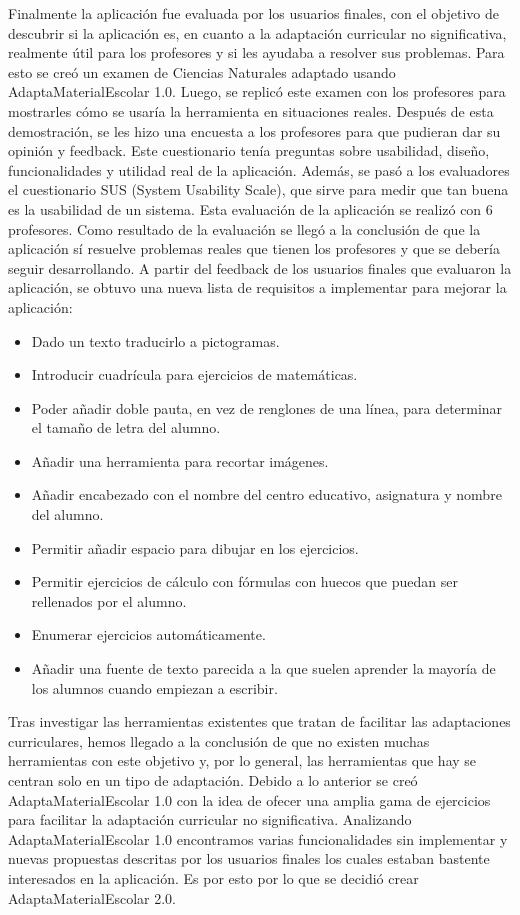 Finalmente la aplicación fue evaluada por los usuarios finales, con el objetivo de descubrir si la aplicación es, en cuanto a la adaptación curricular no significativa, realmente útil para los profesores y si les ayudaba a resolver sus problemas. Para esto se creó un examen de Ciencias Naturales adaptado usando AdaptaMaterialEscolar 1.0. Luego, se replicó este examen con los profesores para mostrarles cómo se usaría la herramienta en situaciones reales. Después de esta demostración, se les hizo una encuesta a los profesores para que pudieran dar su opinión y feedback. Este cuestionario tenía preguntas sobre usabilidad, diseño, funcionalidades y utilidad real de la aplicación. Además, se pasó a los evaluadores el cuestionario SUS (System Usability Scale), que sirve para medir que tan buena es la usabilidad de un sistema. Esta evaluación de la aplicación se realizó con 6 profesores. Como resultado de la evaluación se llegó a la conclusión de que la aplicación sí resuelve problemas reales que tienen los profesores y que se debería seguir desarrollando. A partir del feedback de los usuarios finales que evaluaron la aplicación, se obtuvo una nueva lista de requisitos a implementar para mejorar la aplicación:

\begin{itemize}
    \item Dado un texto traducirlo a pictogramas.
    \item Introducir cuadrícula para ejercicios de matemáticas.
    \item Poder añadir doble pauta, en vez de renglones de una línea, para determinar el tamaño de letra del alumno.
    \item Añadir una herramienta para recortar imágenes.
    \item Añadir encabezado con el nombre del centro educativo, asignatura y nombre del alumno.
    \item Permitir añadir espacio para dibujar en los ejercicios.
    \item Permitir ejercicios de cálculo con fórmulas con huecos que puedan ser rellenados por el alumno.
    \item Enumerar ejercicios automáticamente.
    \item Añadir una fuente de texto parecida a la que suelen aprender la mayoría de los alumnos cuando empiezan a escribir.
\end{itemize}


Tras investigar las herramientas existentes que tratan de facilitar las adaptaciones curriculares, hemos llegado a la conclusión de que no existen muchas herramientas con este objetivo y, por lo general, las herramientas que hay se centran solo en un tipo de adaptación. Debido a lo anterior se creó AdaptaMaterialEscolar 1.0 con la idea de ofecer una amplia gama de ejercicios para facilitar la adaptación curricular no significativa. Analizando AdaptaMaterialEscolar 1.0 encontramos varias funcionalidades sin implementar y nuevas propuestas descritas por los usuarios finales los cuales estaban bastente interesados en la aplicación. Es por esto por lo que se decidió crear AdaptaMaterialEscolar 2.0.
